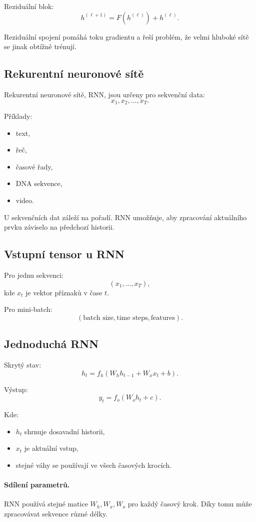 Reziduální blok:
\[
h^{(\ell+1)}
=
F(h^{(\ell)}) + h^{(\ell)}.
\]

Reziduální spojení pomáhá toku gradientu a řeší problém, že velmi hluboké sítě se jinak obtížně trénují.

\subsection{Rekurentní neuronové sítě}

Rekurentní neuronové sítě, RNN, jsou určeny pro sekvenční data:
\[
x_1,x_2,\ldots,x_T.
\]

Příklady:
\begin{itemize}
    \item text,
    \item řeč,
    \item časové řady,
    \item DNA sekvence,
    \item video.
\end{itemize}

U sekvenčních dat záleží na pořadí. RNN umožňuje, aby zpracování aktuálního prvku záviselo na předchozí
historii.

\subsection{Vstupní tensor u RNN}

Pro jednu sekvenci:
\[
(x_1,\ldots,x_T),
\]
kde $x_t$ je vektor příznaků v čase $t$.

Pro mini-batch:
\[
(\text{batch size},\text{time steps},\text{features}).
\]

\subsection{Jednoduchá RNN}

Skrytý stav:
\[
h_t = f_h(W_hh_{t-1}+W_xx_t+b).
\]

Výstup:
\[
y_t = f_o(W_oh_t+c).
\]

Kde:
\begin{itemize}
    \item $h_t$ shrnuje dosavadní historii,
    \item $x_t$ je aktuální vstup,
    \item stejné váhy se používají ve všech časových krocích.
\end{itemize}

\paragraph{Sdílení parametrů.}
RNN používá stejné matice $W_h,W_x,W_o$ pro každý časový krok. Díky tomu může zpracovávat sekvence různé délky.


